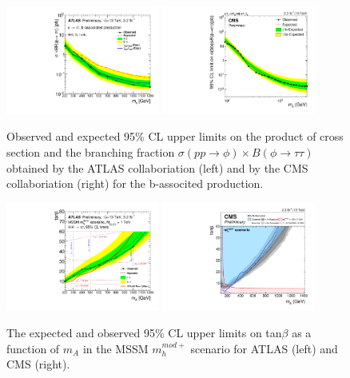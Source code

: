 \begin{figure}
\centering
\includegraphics[width=0.45\textwidth, angle=0] {figures/fig_2Htautau_b.pdf}
\includegraphics[width=0.45\textwidth, angle=0] {figures/fig_2Htautau_d.pdf}
\caption{ Observed and expected 95\% CL upper limits on the product of cross section and the branching fraction $\sigma(pp\rightarrow \phi) \times B(\phi\rightarrow \tau\tau)$ obtained by the ATLAS collaboriation (left) and by the CMS collaboriation (right) for the b-associted production.}
\label{fig_2bHtautau}   
\end{figure}

\begin{figure}
\centering
\includegraphics[width=0.45\textwidth, angle=0] {figures/fig_3Htautau_a.pdf}
\includegraphics[width=0.45\textwidth, angle=0] {figures/fig_3Htautau_b.pdf}
\caption{ The expected and observed 95\% CL upper limits on tan$\beta$ as a function of $m_{A}$ in the MSSM $m_{h}^{mod+}$ scenario for ATLAS (left) and CMS (right).}
\label{fig_3Htautau}   
\end{figure}

